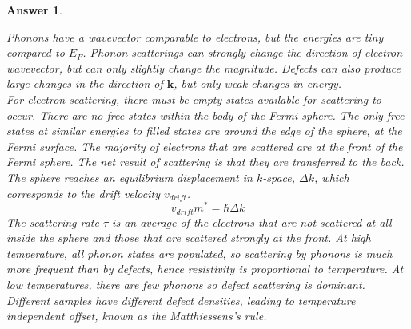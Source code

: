 \documentclass[a4paper]{article}
\newtheorem{ans}{Answer}[subsection]
\theoremstyle{new}
\begin{document}
\begin{ans}
\begin{itemize}
\end{itemize}
Phonons have a wavevector comparable to electrons, but the energies are tiny compared to $E_F$. Phonon scatterings can strongly change the direction of electron wavevector, but can only slightly change the magnitude. Defects can also produce large changes in the direction of $\mathbf{k}$, but only weak changes in energy.\\[5pt] 
For electron scattering, there must be empty states available for scattering to occur. There are no free states within the body of the Fermi sphere. The only free states at similar energies to filled states are around the edge of the sphere, at the Fermi surface. The majority of electrons that are scattered are at the front of the Fermi sphere. The net result of scattering is that they are transferred to the back. The sphere reaches an equilibrium displacement in $k$-space, $\Delta k$, which corresponds to the drift velocity $v_{drift}$.
$$v_{drift}m^*=\hbar\Delta k$$
The scattering rate $\tau$ is an average of the electrons that are not scattered at all inside the sphere and those that are scattered strongly at the front. At high temperature, all phonon states are populated, so scattering by phonons is much more frequent than by defects, hence resistivity is proportional to temperature. At low temperatures, there are few phonons so defect scattering is dominant. Different samples have different defect densities, leading to temperature independent offset, known as the Matthiessens's rule.

\end{ans}
\end{document}
